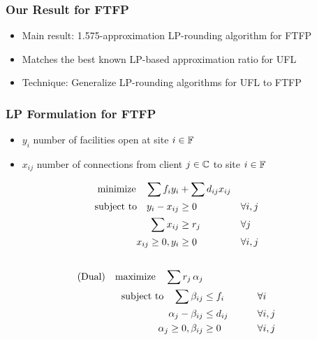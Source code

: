\documentclass[handout, hyperref, dvipsnames]{beamer}
\begin{document}
\begin{frame}
  \frametitle{Our Result for FTFP}

  \begin{itemize}\addtolength{\itemsep}{1\baselineskip}
  \item Main result: 1.575-approximation LP-rounding algorithm for FTFP
  \item Matches the best known LP-based approximation ratio for UFL
  \item Technique: Generalize LP-rounding algorithms for UFL to FTFP
  \end{itemize}
\end{frame}


\begin{frame}
  \frametitle{LP Formulation for FTFP}
  \begin{itemize}
  \item $y_i$   number of facilities open at site $i\in \mathbb{F}$
  \item $x_{ij}$ number of connections from client $j\in
    \mathbb{C}$ to site $i \in \mathbb{F}$
  \end{itemize}
  \begin{alignat}{3}
    \textrm{minimize}\quad \sum f_iy_i &+ \sum d_{ij}x_{ij}&
    \\ \notag
    \textrm{subject to}\quad y_i - x_{ij} &\geq 0  & &\forall i,j
    \\ \notag
    \sum x_{ij} &\geq r_j & &\forall j
    \\ \notag
    x_{ij} \geq 0, y_i &\geq 0 & &\forall i,j
    \\ \notag
  \end{alignat}
  \begin{alignat}{3}
  \text{(Dual)}\quad  \textrm{maximize}\quad \sum r_j\, \alpha_j&
    \\ \notag
    \textrm{subject to} \quad 
      \sum \beta_{ij} &\leq f_i  &\quad\quad			&\forall i
    \\ \notag
    \alpha_{j} - \beta_{ij} 	&\leq  d_{ij}       &                 & \forall i,j
    \\ \notag
    \alpha_j \geq 0, \beta_{ij} &\geq 0           &            & \forall i,j
  \end{alignat}
\end{frame}
\end{document}
